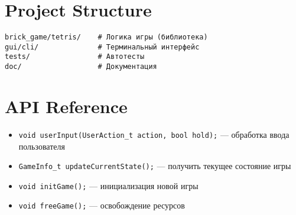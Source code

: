 \documentclass{article}
\begin{document}
\section{Project Structure}
\begin{verbatim}
brick_game/tetris/    # Логика игры (библиотека)
gui/cli/              # Терминальный интерфейс
tests/                # Автотесты
doc/                  # Документация
\end{verbatim}

\section{API Reference}
\begin{itemize}
  \item \texttt{void userInput(UserAction\_{}t action, bool hold);} — обработка ввода пользователя
  \item \texttt{GameInfo\_{}t updateCurrentState();} — получить текущее состояние игры
  \item \texttt{void initGame();} — инициализация новой игры
  \item \texttt{void freeGame();} — освобождение ресурсов
\end{itemize}
\end{document}
